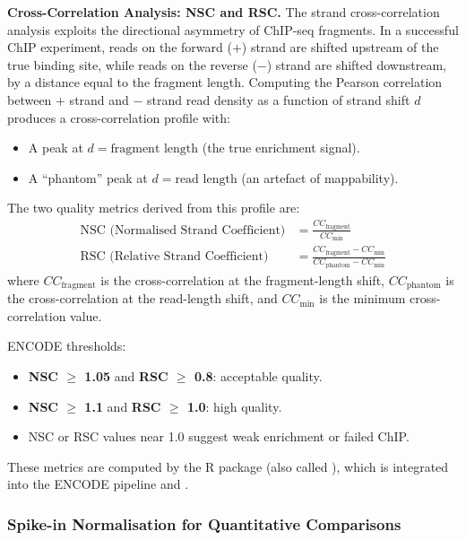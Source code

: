 \textbf{Cross-Correlation Analysis: NSC and RSC.} The strand cross-correlation analysis exploits the directional asymmetry of ChIP-seq fragments. In a successful ChIP experiment, reads on the forward ($+$) strand are shifted upstream of the true binding site, while reads on the reverse ($-$) strand are shifted downstream, by a distance equal to the fragment length. Computing the Pearson correlation between $+$ strand and $-$ strand read density as a function of strand shift $d$ produces a cross-correlation profile with:

\begin{itemize}[itemsep=2pt]
  \item A peak at $d = \text{fragment length}$ (the true enrichment signal).
  \item A ``phantom'' peak at $d = \text{read length}$ (an artefact of mappability).
\end{itemize}

The two quality metrics derived from this profile are:
\begin{align}
\label{eq:histones:nsc}
\text{NSC (Normalised Strand Coefficient)} &= \frac{CC_{\text{fragment}}}{CC_{\min}} \\[6pt]
\label{eq:histones:rsc}
\text{RSC (Relative Strand Coefficient)} &= \frac{CC_{\text{fragment}} - CC_{\min}}{CC_{\text{phantom}} - CC_{\min}}
\end{align}
where $CC_{\text{fragment}}$ is the cross-correlation at the fragment-length shift, $CC_{\text{phantom}}$ is the cross-correlation at the read-length shift, and $CC_{\min}$ is the minimum cross-correlation value.

ENCODE thresholds:
\begin{itemize}[itemsep=2pt]
  \item \textbf{NSC $\geq$ 1.05} and \textbf{RSC $\geq$ 0.8}: acceptable quality.
  \item \textbf{NSC $\geq$ 1.1} and \textbf{RSC $\geq$ 1.0}: high quality.
  \item NSC or RSC values near 1.0 suggest weak enrichment or failed ChIP.
\end{itemize}

These metrics are computed by the  R package (also called ), which is integrated into the ENCODE pipeline and .

\subsubsection{Spike-in Normalisation for Quantitative Comparisons}
\label{subsubsec:histones:spikein}

